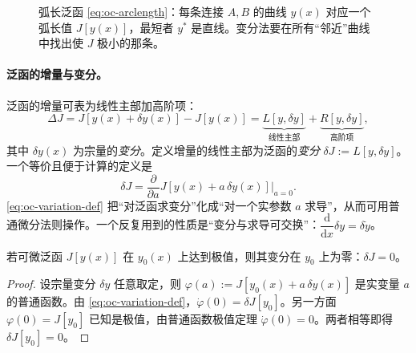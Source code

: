 \begin{figure}[ht]
\centering
{}
\caption{弧长泛函 \cref{eq:oc-arclength}：每条连接 $A,B$ 的曲线 $y(x)$ 对应一个弧长值 $J[y(x)]$，最短者 $y^*$ 是直线。变分法要在所有“邻近”曲线中找出使 $J$ 极小的那条。}
\label{fig:oc-arclength}
\end{figure}

\paragraph{泛函的增量与变分。}
泛函的增量可表为线性主部加高阶项：
\begin{equation}
  \Delta J=J[y(x)+\delta y(x)]-J[y(x)]=\underbrace{L[y,\delta y]}_{\text{线性主部}}+\underbrace{R[y,\delta y]}_{\text{高阶项}},
  \label{eq:oc-increment}
\end{equation}
其中 $\delta y(x)$ 为宗量的\emph{变分}。定义增量的线性主部为泛函的\emph{变分} $\delta J:=L[y,\delta y]$。一个等价且便于计算的定义是
\begin{equation}
  \delta J=\frac{\partial}{\partial a}J[y(x)+a\,\delta y(x)]\Big|_{a=0}.
  \label{eq:oc-variation-def}
\end{equation}
\cref{eq:oc-variation-def} 把“对泛函求变分”化成“对一个实参数 $a$ 求导”，从而可用普通微分法则操作。一个反复用到的性质是“变分与求导可交换”：$\dfrac{\mathrm d}{\mathrm dx}\delta y=\delta\dot y$。

\begin{theorem}[泛函极值的必要条件]\label{thm:oc-variation-zero}
若可微泛函 $J[y(x)]$ 在 $y_0(x)$ 上达到极值，则其变分在 $y_0$ 上为零：$\delta J=0$。
\end{theorem}
\begin{proof}
设宗量变分 $\delta y$ 任意取定，则 $\varphi(a):=J[y_0(x)+a\,\delta y(x)]$ 是实变量 $a$ 的普通函数。由 \cref{eq:oc-variation-def}，$\dot\varphi(0)=\delta J[y_0]$。另一方面 $\varphi(0)=J[y_0]$ 已知是极值，由普通函数极值定理 $\dot\varphi(0)=0$。两者相等即得 $\delta J[y_0]=0$。
\end{proof}

